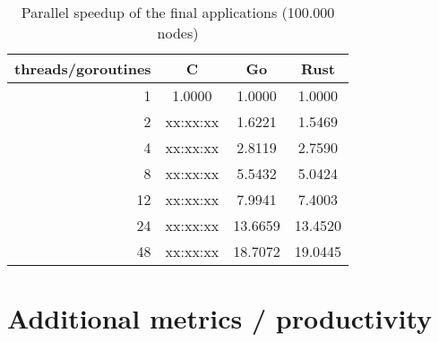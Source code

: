 \begin{table}[htb]
    \centering
    \begin{tabular}{rccc}
        \toprule
            threads/goroutines
            & C
            & Go
            & Rust \\
        \midrule

            1
            & 1.0000
            & 1.0000
            & 1.0000 \\

            2
            & xx:xx:xx
            & 1.6221
            & 1.5469 \\

            4
            & xx:xx:xx
            & 2.8119
            & 2.7590 \\

            8
            & xx:xx:xx
            & 5.5432
            & 5.0424 \\

            12
            & xx:xx:xx
            & 7.9941
            & 7.4003 \\

            24
            & xx:xx:xx
            & 13.6659
            & 13.4520 \\

            48
            & xx:xx:xx
            & 18.7072
            & 19.0445 \\

        \bottomrule
    \end{tabular}
    \caption{Parallel speedup of the final applications (100.000 nodes)}
    \label{tb:final_speedup}
\end{table}

\section{Additional metrics / productivity}
\label{sec:Evaluation::Metrics}

